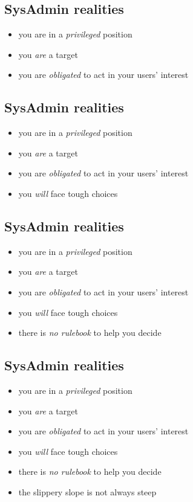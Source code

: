 \documentclass[xga]{xdvislides}
\begin{document}
\subsection{SysAdmin realities}
\begin{itemize}
	\item you are in a {\em privileged} position
	\item you {\em are} a target
	\item you are {\em obligated} to act in your users' interest
\end{itemize}

\subsection{SysAdmin realities}
\begin{itemize}
	\item you are in a {\em privileged} position
	\item you {\em are} a target
	\item you are {\em obligated} to act in your users' interest
	\item you {\em will} face tough choices
\end{itemize}

\subsection{SysAdmin realities}
\begin{itemize}
	\item you are in a {\em privileged} position
	\item you {\em are} a target
	\item you are {\em obligated} to act in your users' interest
	\item you {\em will} face tough choices
	\item there is {\em no rulebook} to help you decide
\end{itemize}

\subsection{SysAdmin realities}
\begin{itemize}
	\item you are in a {\em privileged} position
	\item you {\em are} a target
	\item you are {\em obligated} to act in your users' interest
	\item you {\em will} face tough choices
	\item there is {\em no rulebook} to help you decide
	\item the slippery slope is not always steep
\end{itemize}
\end{document}
